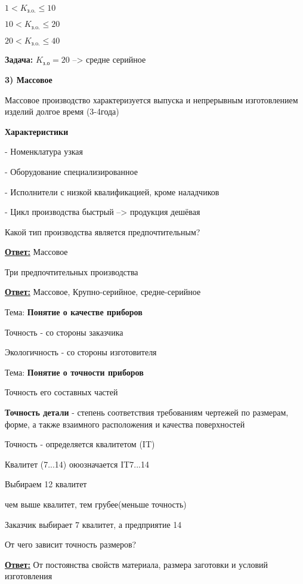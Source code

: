 {\begin{center}
    \par$1<K_\text{з.o.}\leq 10$
    \par$10<K_\text{з.o.}\leq 20$
    \par$20<K_\text{з.o.}\leq 40$
    \par\textbf{Задача:} $K_\text{з.о} = 20$ --> средне серийное
    \par\textbf{3) Массовое}
    \par Массовое производство характеризуется выпуска и непрерывным изготовлением изделий долгое время (3-4года)
    \par \textbf{Характеристики}
    \par - Номенклатура узкая
    \par - Оборудование специализированное
    \par - Исполнители с низкой квалификацией, кроме наладчиков
    \par - Цикл производства быстрый --> продукция дешёвая
    \par * Какой тип производства является предпочтительным?
    \par\underline{\textbf{Ответ:}} Массовое
    \par Три предпочтительных производства
    \par\underline{\textbf{Ответ:}} Массовое, Крупно-серийное, средне-серийное
    \par Тема: \textbf{Понятие о качестве приборов}
    \par Точность - со стороны заказчика 
    \par Экологичность - со стороны изготовителя
    \par Тема: \textbf{Понятие о точности приборов}
    \par * Точность его составных частей
    \par * \textbf{Точность детали} - степень соответствия требованиям чертежей по размерам, форме, а также взаимного расположения и качества поверхностей
    
    \par * Точность - определяется квалитетом (IT)
\par Квалитет (7...14) оюозначается IT7...14
\par Выбираем 12 квалитет
\par чем выше квалитет, тем грубее(меньше точность)
\par Заказчик выбирает 7 квалитет, а предприятие 14

\par От чего зависит точность размеров?
\par\underline{\textbf{Ответ:}} От постоянства свойств материала, размера заготовки и условий изготовления 


\end{center}}
